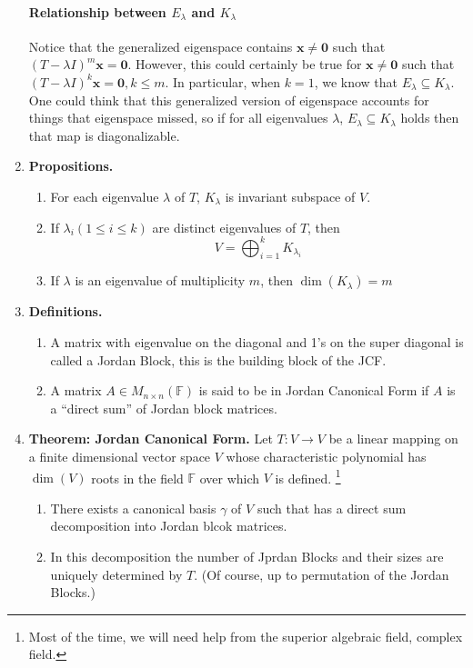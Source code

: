 \documentclass[oneside, 12pt]{book}
\newcommand{\settag}[1]{\renewcommand{\theenumi}{#1}}
\newcommand{\field}{\mathbb{F}}
\newcommand{\tbf}[1]{\textbf{#1}}
\newcommand{\trans}[3]{$#1:#2\rightarrow{}#3$}
\newcommand{\map}[3]{\text{$\left[#1\right]_{#2}^{#3}$}}
\newcommand{\para}[1]{\item \tbf{#1}}
\newcommand{\vx}{\mathbf{x}}
\newcommand{\vzero}{\mathbf{0}}
\begin{document}
\begin{enumerate}
    \paragraph{Relationship between $E_\lambda$ and $K_\lambda$} Notice that the generalized eigenspace contains $\vx \neq \vzero$ such that $(T-\lambda I)^m\vx = \vzero$. However, 
    this could certainly be true for $\vx\neq \vzero$ such that $(T-\lambda I)^k\vx = \vzero, k\leq m$. In particular, when $k = 1$, we know that $E_\lambda \subseteq K_\lambda$. One
    could think that this generalized version of eigenspace accounts for things that eigenspace missed, so if for all eigenvalues $\lambda$, $E_\lambda \subseteq K_\lambda$ holds
    then that map is diagonalizable. 

    \settag{6.3.4}
    \para{Propositions.}
    \begin{enumerate}
        \item For each eigenvalue $\lambda$ of $T$, $K_\lambda$ is invariant subspace of $V$.
        \item If $\lambda_i (1\leq i\leq k)$ are distinct eigenvalues of $T$, then 
        \begin{equation*}
            V = \bigoplus_{i=1}^k K_{\lambda_i}
        \end{equation*}
        \item If $\lambda$ is an eigenvalue of multiplicity $m$, then $\dim(K_\lambda) = m$
    \end{enumerate}

    \settag{6.3.5}
    \para{Definitions.}
    \begin{enumerate}
        \item A matrix with eigenvalue on the diagonal and 1's on the super diagonal is called a Jordan Block, this is the building block of the JCF.
        \item A matrix $A\in M_{n\times n}(\field)$ is said to be in Jordan Canonical Form if $A$ is a ``direct sum'' of Jordan block matrices.
    \end{enumerate}

    \settag{6.3.6}
    \para{Theorem: Jordan Canonical Form.} Let \trans{T}{V}{V} be a linear mapping on a finite dimensional vector space $V$ whose characteristic polynomial
    has $\dim(V)$ roots in the field $\field$ over which $V$ is defined. \footnote{Most of the time, we will need help from the superior algebraic field, complex field.}
    \begin{enumerate}
        \item There exists a canonical basis $\gamma$ of $V$ such that \map{T}{\gamma}{\gamma} has a direct sum decomposition into Jordan blcok matrices.
        \item In this decomposition the number of Jprdan Blocks and their sizes are uniquely determined by $T$. (Of course, up to permutation of the Jordan Blocks.)
    \end{enumerate}
\end{enumerate}
\end{document}
